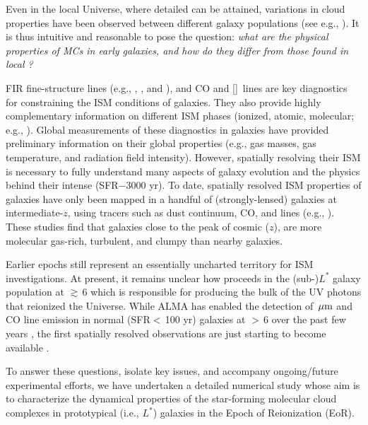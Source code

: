 \IfFileExists{emulateapjlegacy.cls}{\documentclass[iop]{emulateapjlegacy}}{\documentclass[iop]{emulateapj}}
\begin{document}
Even in the local Universe, where detailed \obs can be attained, variations in cloud properties have been observed between different galaxy populations (see e.g., \citealt{Hughes10a, Hughes13b}). It is thus intuitive and reasonable to pose the question: {\it what are the physical properties of MCs in early galaxies, and how do they differ from those found in local \galpop?}
%

FIR fine-structure lines (e.g., \cii, \nii, and \oiii), and CO and [\ci]~lines are key diagnostics for constraining the ISM conditions of galaxies. They also provide highly complementary information on different ISM phases (ionized, atomic, molecular; e.g., \citealt{Scoville74a, Rubin85a, Malhotra01a}).
%
Global measurements of these diagnostics in \highz galaxies have provided preliminary information on their global properties (e.g., gas masses, gas temperature, and radiation field intensity). However, spatially resolving their ISM is necessary to fully understand many aspects of galaxy evolution and the physics behind their intense \SF (SFR$-$3000\,\Msun\,yr\pmOne).
%
To date, spatially resolved ISM properties of \highz galaxies have only been mapped in a handful of (strongly-lensed) galaxies at intermediate-$z$, using tracers such as dust continuum, CO, and \cii lines (e.g., \citealt{Swinbank11a, Hodge15a, Ferkinhoff15a, Hodge16a, Leung19a}). These studies find that galaxies close to the peak of cosmic \SF ($z$), are more molecular gas-rich, turbulent, and clumpy than nearby galaxies.

Earlier epochs still represent an essentially uncharted territory for ISM investigations. At present, it remains unclear how \SF proceeds in the (sub-)$L^*$ galaxy population at \z$\gtrsim$\,6  which is responsible for producing the bulk of the UV photons that reionized the Universe.
%
While ALMA has enabled the detection of \,$\mbox{$\mu$m}$ and CO line emission in normal (SFR$<$\,100\,\Msun\,yr\pmOne) galaxies at \z$>$\,6 over the past few years \citep[e.g.,][]{Carniani18b, Odorico18a}, the first spatially resolved observations are just starting to become available \citep{Smit18a,Jones17a}. 

To answer these questions, isolate key issues, and  accompany ongoing/future experimental efforts, we have undertaken a detailed numerical study whose aim is to characterize the dynamical properties of the star-forming molecular cloud complexes in prototypical (i.e., $L^*$) galaxies in the Epoch of Reionization (EoR). 
\end{document}
